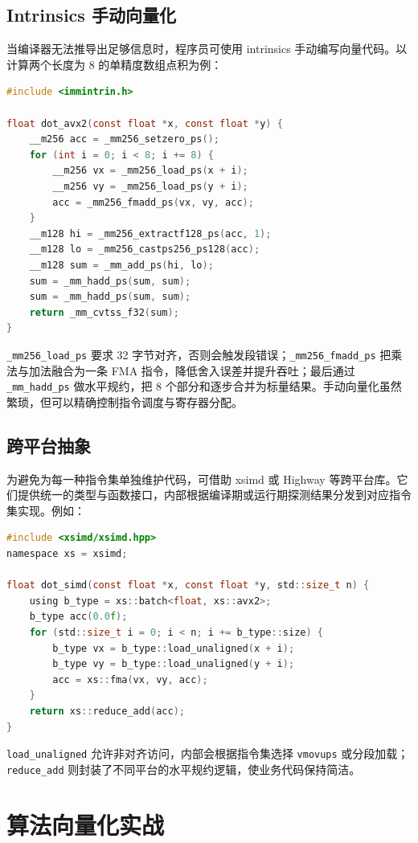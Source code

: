\section{Intrinsics 手动向量化}
当编译器无法推导出足够信息时，程序员可使用 intrinsics 手动编写向量代码。以计算两个长度为 8 的单精度数组点积为例：\par
\begin{lstlisting}[language=c]
#include <immintrin.h>

float dot_avx2(const float *x, const float *y) {
    __m256 acc = _mm256_setzero_ps();
    for (int i = 0; i < 8; i += 8) {
        __m256 vx = _mm256_load_ps(x + i);
        __m256 vy = _mm256_load_ps(y + i);
        acc = _mm256_fmadd_ps(vx, vy, acc);
    }
    __m128 hi = _mm256_extractf128_ps(acc, 1);
    __m128 lo = _mm256_castps256_ps128(acc);
    __m128 sum = _mm_add_ps(hi, lo);
    sum = _mm_hadd_ps(sum, sum);
    sum = _mm_hadd_ps(sum, sum);
    return _mm_cvtss_f32(sum);
}
\end{lstlisting}
\texttt{\_{}mm256\_{}load\_{}ps} 要求 32 字节对齐，否则会触发段错误；\texttt{\_{}mm256\_{}fmadd\_{}ps} 把乘法与加法融合为一条 FMA 指令，降低舍入误差并提升吞吐；最后通过 \texttt{\_{}mm\_{}hadd\_{}ps} 做水平规约，把 8 个部分和逐步合并为标量结果。手动向量化虽然繁琐，但可以精确控制指令调度与寄存器分配。\par
\section{跨平台抽象}
为避免为每一种指令集单独维护代码，可借助 xsimd 或 Highway 等跨平台库。它们提供统一的类型与函数接口，内部根据编译期或运行期探测结果分发到对应指令集实现。例如：\par
\begin{lstlisting}[language=c]
#include <xsimd/xsimd.hpp>
namespace xs = xsimd;

float dot_simd(const float *x, const float *y, std::size_t n) {
    using b_type = xs::batch<float, xs::avx2>;
    b_type acc(0.0f);
    for (std::size_t i = 0; i < n; i += b_type::size) {
        b_type vx = b_type::load_unaligned(x + i);
        b_type vy = b_type::load_unaligned(y + i);
        acc = xs::fma(vx, vy, acc);
    }
    return xs::reduce_add(acc);
}
\end{lstlisting}
\texttt{load\_{}unaligned} 允许非对齐访问，内部会根据指令集选择 \texttt{vmovups} 或分段加载；\texttt{reduce\_{}add} 则封装了不同平台的水平规约逻辑，使业务代码保持简洁。\par
\chapter{算法向量化实战}
